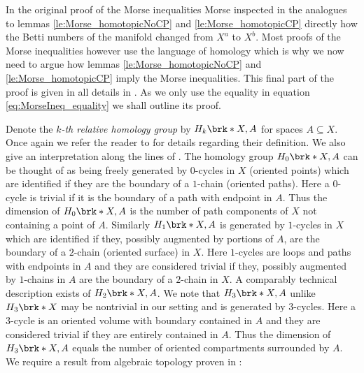 In the original proof \cite{Morse1925} of the Morse inequalities Morse inspected
in the analogues to lemmas \ref{le:Morse_homotopicNoCP} and \ref{le:Morse_homotopicCP} directly how the Betti numbers of the manifold
changed from $X^a$ to $X^b$.
Most proofs of the Morse inequalities however use the language of homology which
is why we now need to argue how lemmas \ref{le:Morse_homotopicNoCP} and \ref{le:Morse_homotopicCP} imply the Morse inequalities.
This final part of the proof is given in all details in \cite[§I.5]{Milnor1963}.
As we only use the equality in equation \eqref{eq:MorseIneq_equality} we shall outline its proof.

Denote the \emph{$k$-th relative homology group} by $H_k\brk*{X,A}$ for spaces $A\subseteq X$.
Once again we refer the reader to \cite[Chapter 2]{Hatcher2002} for details regarding their definition.
We also give an interpretation along the lines of \cite{Cantarella2002}.
The homology group $H_0\brk*{X,A}$ can be thought of as being freely generated by $0$-cycles in $X$ (oriented points)
which are identified if they are the boundary of a $1$-chain (oriented paths).
Here a $0$-cycle is trivial if it is the boundary of a path with endpoint in $A$.
Thus the dimension of $H_0\brk*{X,A}$ is the number of path components of $X$ not containing a point of $A$.
Similarly $H_1\brk*{X,A}$ is generated by $1$-cycles in $X$ which are identified if they, possibly augmented by 
portions of $A$, are the boundary of a $2$-chain (oriented surface) in $X$.
Here $1$-cycles are loops and paths with endpoints in $A$ and they are considered trivial if they, possibly augmented by $1$-chains in $A$ are the boundary
of a $2$-chain in $X$.
A comparably technical description exists of $H_2\brk*{X,A}$.
We note that $H_3\brk*{X,A}$ unlike $H_3\brk*{X}$ may be nontrivial in our setting and is generated by $3$-cycles.
Here a $3$-cycle is an oriented volume with boundary contained in $A$ and they are considered trivial if
they are entirely contained in $A$.
Thus the dimension of $H_3\brk*{X,A}$ equals the number of oriented compartments surrounded by $A$.
%
We require a result from algebraic topology proven in \cite[Corollary 2.24]{Hatcher2002}:
